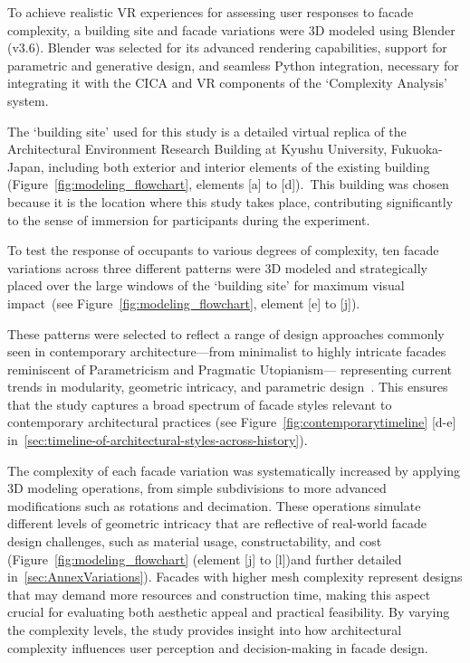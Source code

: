 %    



To achieve realistic VR experiences for assessing user responses to facade complexity, a building site and facade variations were 3D modeled using Blender (v3.6).
Blender was selected for its advanced rendering capabilities, support for parametric and generative design, and seamless Python integration, necessary for integrating it with the CICA and VR components of the `Complexity Analysis' system.

The `building site' used for this study is a detailed virtual replica of the Architectural Environment Research Building at Kyushu University, Fukuoka-Japan, including both exterior and interior elements of the existing building (Figure~\ref{fig:modeling_flowchart}, elements [a] to [d]).~This building was chosen because it is the location where this study takes place, contributing significantly to the sense of immersion for participants during the experiment.

To test the response of occupants to various degrees of complexity, ten facade variations across three different patterns were 3D modeled and strategically placed over the large windows of the `building site' for maximum visual impact~(see Figure~\ref{fig:modeling_flowchart}, element [e] to [j]).

These patterns were selected to reflect a range of design approaches commonly seen in contemporary architecture—from minimalist to highly intricate facades reminiscent of Parametricism and Pragmatic Utopianism— representing current trends in modularity, geometric intricacy, and parametric design~\cite{Leach2016}. This ensures that the study captures a broad spectrum of facade styles relevant to contemporary architectural practices (see Figure~\ref{fig:contemporarytimeline} [d-e] in~\ref{sec:timeline-of-architectural-styles-across-history}).


The complexity of each facade variation was systematically increased by applying 3D modeling operations, from simple subdivisions to more advanced modifications such as rotations and decimation.
These operations simulate different levels of geometric intricacy that are reflective of real-world facade design challenges, such as material usage, constructability, and cost (Figure~\ref{fig:modeling_flowchart} (element [j] to [l])and further detailed in~\ref{sec:AnnexVariations}). Facades with higher mesh complexity represent designs that may demand more resources and construction time, making this aspect crucial for evaluating both aesthetic appeal and practical feasibility.
By varying the complexity levels, the study provides insight into how architectural complexity influences user perception and decision-making in facade design.

